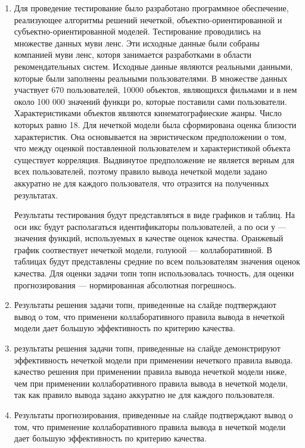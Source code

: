 \documentclass[a4paper,11pt]{proc}
\begin{document}
{\begin{enumerate}
	\item Для проведение тестирование было разработано программное обеспечение,
		реализующее алгоритмы решений нечеткой, объектно-ориентированной и
		субъектно-ориентированной моделей.
		Тестирование проводились на множестве данных муви ленс.
		Эти исходные данные были собраны компанией муви ленс, которя
		занимается разработками в области рекомендательных систем. Исходные
		данные являются реальными данными, которые были заполнены реальными
		пользователями. В множестве данных участвует 670 пользователей, 10000
		объектов, являющихся фильмами и в нем около 100 000 значений
		функци ро, которые поставили сами пользователи.
		Характеристиками объектов являются кинематографиеские жанры. Число
		которых равно 18. Для нечеткой модели была сформирована
		оценка близости характеристик. Она основывается на эвристическом
		предположении о том, что
		между оценкой поставленной пользователем
		и характеристикой объекта существует корреляция. Выдвинутое
		предположение не является верным для всех пользователей, поэтому
		правило вывода нечеткой модели задано аккуратно не для каждого
		пользователя, что отразится на полученных результатах.

		Результаты
		тестирования будут представляться в виде графиков и таблиц. На оси икс
		будут располагаться идентификаторы пользователей, а по оси у ---
		значения функций, используемых в качестве оценок качества. Оранжевый
		график соотвествует нечеткой модели, голуюой --- коллаборативной. В
		таблицах будут представлены средние по всем пользователям значения
		оценок качества. Для оценки задачи топн
		топн использовалась точность, для оценки прогнозирования
		--- нормированная абсолютная погрешнось.

	\item Результаты решения задачи топн, приведенные на слайде подтверждают вывод о
		том, что применени коллаборативного правила вывода в нечеткой модели
		дает большую эффективность по критерию качества.

	\item результаты решения задачи топн, приведенные на слайде демонстрируют
		эффективность нечеткой модели при применении нечеткого правила вывода.
		качество решения при применении правила вывода нечеткой модели ниже,
		чем при применении коллаборативного правила вывода в нечеткой модели,
		так как правило вывода задано аккуратно не для каждого пользователя.

	\item Результаты прогнозирования, приведенные на слайде подтверждают вывод о
		том, что применение коллаборативного правила вывода в нечеткой модели
		дает большую эффективность по критерию качества.


\end{enumerate}}
\end{document}
